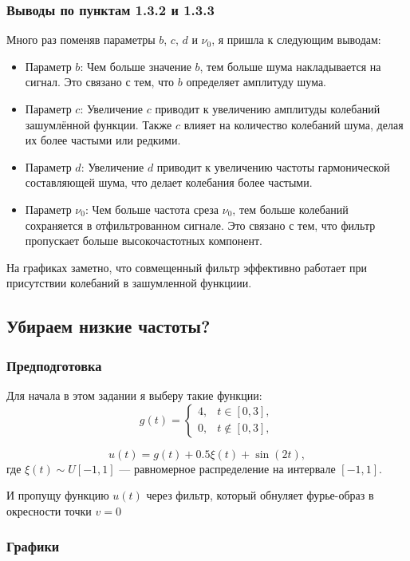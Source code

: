 \documentclass[a4paper,12pt]{article}
\begin{document}
\subsubsection{Выводы по пунктам 1.3.2 и 1.3.3}

Много раз поменяв параметры \(b\), \(c\), \(d\) и \(\nu_0\), я пришла к следующим выводам:
\begin{itemize}
    \item Параметр \(b\): Чем больше значение \(b\), тем больше шума накладывается на сигнал. Это связано с тем, что \(b\) определяет амплитуду шума.
    \item Параметр \(c\): Увеличение \(c\) приводит к увеличению амплитуды колебаний зашумлённой функции. Также \(c\) влияет на количество колебаний шума, делая их более частыми или редкими.
    \item Параметр \(d\): Увеличение \(d\) приводит к увеличению частоты гармонической составляющей шума, что делает колебания более частыми.
    \item Параметр \(\nu_0\): Чем больше частота среза \(\nu_0\), тем больше колебаний сохраняется в отфильтрованном сигнале. Это связано с тем, что фильтр пропускает больше высокочастотных компонент.
\end{itemize}

На графиках заметно, что совмещенный фильтр эффективно работает при присутствии
колебаний в зашумленной функциии.

\subsection{Убираем низкие частоты?}
\subsubsection{Предподготовка}
Для начала в этом задании я выберу такие функции:
\[
g(t) = 
\begin{cases} 
4, & t \in [0, 3], \\
0, & t \notin [0, 3],
\end{cases}
\]

\[
u(t) = g(t) + 0.5\xi(t) + \sin(2t),
\]
где \(\xi(t) \sim U[-1, 1]\) — равномерное распределение на интервале \([-1, 1]\).

И пропущу функцию \(u(t)\) через фильтр, который обнуляет фурье-образ в 
окресности точки \(v = 0\)

\subsubsection{Графики}
\end{document}
